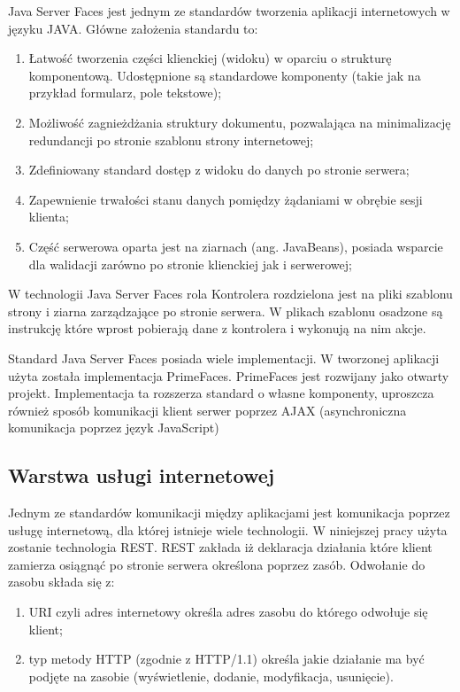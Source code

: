 Java Server Faces jest jednym ze standardów tworzenia aplikacji internetowych w języku JAVA\cite{jsfRef}. Główne założenia standardu to:
\begin{enumerate}
  \item Łatwość tworzenia części klienckiej (widoku) w oparciu o strukturę komponentową. Udostępnione są standardowe komponenty (takie jak na przykład formularz, pole tekstowe);
  \item Możliwość zagnieżdżania struktury dokumentu, pozwalająca na minimalizację redundancji po stronie szablonu strony internetowej; 
  \item Zdefiniowany standard dostęp z widoku do danych po stronie serwera;
  \item Zapewnienie trwałości stanu danych pomiędzy żądaniami w obrębie sesji klienta;
  \item Część serwerowa oparta jest na ziarnach (ang. JavaBeans), posiada wsparcie dla walidacji zarówno po stronie klienckiej jak i serwerowej;
\end{enumerate}

W technologii Java Server Faces rola Kontrolera rozdzielona jest na pliki szablonu strony i ziarna zarządzające po stronie serwera. W plikach szablonu osadzone są instrukcję które wprost pobierają dane z kontrolera i wykonują na nim akcje.

Standard Java Server Faces posiada wiele implementacji. W tworzonej aplikacji użyta została implementacja PrimeFaces\cite{primeFaces}. PrimeFaces jest rozwijany jako otwarty projekt. Implementacja ta rozszerza standard o własne komponenty, uproszcza również sposób komunikacji klient serwer poprzez AJAX (asynchroniczna komunikacja poprzez język JavaScript)

\subsection{Warstwa usługi internetowej}



Jednym ze standardów komunikacji między aplikacjami jest komunikacja poprzez usługę internetową, dla której istnieje wiele technologii. W niniejszej pracy użyta zostanie technologia REST. REST zakłada iż deklaracja działania które klient zamierza osiągnąć po stronie serwera określona poprzez zasób. Odwołanie do zasobu składa się z:
\begin{enumerate}
  \item URI czyli adres internetowy określa adres zasobu do którego odwołuje się klient;
  \item  typ metody HTTP (zgodnie z HTTP/1.1) określa jakie działanie ma być podjęte na zasobie (wyświetlenie, dodanie, modyfikacja, usunięcie).
\end{enumerate}

